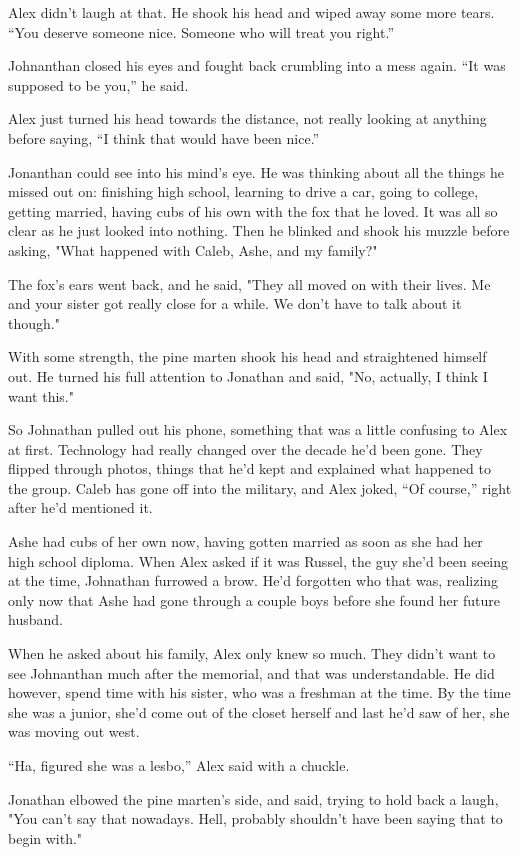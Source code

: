Alex didn't laugh at that. He shook his head and wiped away some more
tears. ``You deserve someone nice. Someone who will treat you right.''

Johnanthan closed his eyes and fought back crumbling into a mess again.
``It was supposed to be you,'' he said.

Alex just turned his head towards the distance, not really looking at
anything before saying, ``I think that would have been nice.''

Jonanthan could see into his mind's eye. He was thinking about all the
things he missed out on: finishing high school, learning to drive a car,
going to college, getting married, having cubs of his own with the fox
that he loved. It was all so clear as he just looked into nothing. Then
he blinked and shook his muzzle before asking, "What happened with
Caleb, Ashe, and my family?"

The fox's ears went back, and he said, "They all moved on with their
lives. Me and your sister got really close for a while. We don't have to
talk about it though."

With some strength, the pine marten shook his head and straightened
himself out. He turned his full attention to Jonathan and said, "No,
actually, I think I want this."

So Johnathan pulled out his phone, something that was a little confusing
to Alex at first. Technology had really changed over the decade he'd
been gone. They flipped through photos, things that he'd kept and
explained what happened to the group. Caleb has gone off into the
military, and Alex joked, ``Of course,'' right after he'd mentioned it.

Ashe had cubs of her own now, having gotten married as soon as she had
her high school diploma. When Alex asked if it was Russel, the guy she'd
been seeing at the time, Johnathan furrowed a brow. He'd forgotten who
that was, realizing only now that Ashe had gone through a couple boys
before she found her future husband.

When he asked about his family, Alex only knew so much. They didn't want
to see Johnanthan much after the memorial, and that was understandable.
He did however, spend time with his sister, who was a freshman at the
time. By the time she was a junior, she'd come out of the closet herself
and last he'd saw of her, she was moving out west.

``Ha, figured she was a lesbo,'' Alex said with a chuckle.

Jonathan elbowed the pine marten's side, and said, trying to hold back a
laugh, "You can't say that nowadays. Hell, probably shouldn't have been
saying that to begin with."

